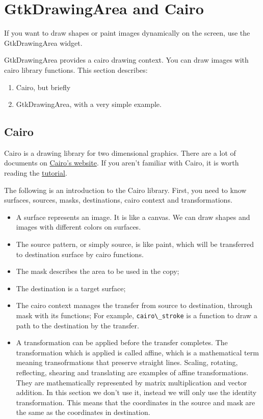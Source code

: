 \section{GtkDrawingArea and Cairo}\label{gtkdrawingarea-and-cairo}

If you want to draw shapes or paint images dynamically on the screen,
use the GtkDrawingArea widget.

GtkDrawingArea provides a cairo drawing context. You can draw images
with cairo library functions. This section describes:

\begin{enumerate}
\def\labelenumi{\arabic{enumi}.}
\tightlist
\item
  Cairo, but briefly
\item
  GtkDrawingArea, with a very simple example.
\end{enumerate}

\subsection{Cairo}\label{cairo}

Cairo is a drawing library for two dimensional graphics. There are a lot
of documents on \href{https://www.cairographics.org/}{Cairo's website}.
If you aren't familiar with Cairo, it is worth reading the
\href{https://www.cairographics.org/tutorial/}{tutorial}.

The following is an introduction to the Cairo library. First, you need
to know surfaces, sources, masks, destinations, cairo context and
transformations.

\begin{itemize}
\tightlist
\item
  A surface represents an image. It is like a canvas. We can draw shapes
  and images with different colors on surfaces.
\item
  The source pattern, or simply source, is like paint, which will be
  transferred to destination surface by cairo functions.
\item
  The mask describes the area to be used in the copy;
\item
  The destination is a target surface;
\item
  The cairo context manages the transfer from source to destination,
  through mask with its functions; For example,
  \passthrough{\lstinline!cairo\_stroke!} is a function to draw a path
  to the destination by the transfer.
\item
  A transformation can be applied before the transfer completes. The
  transformation which is applied is called affine, which is a
  mathematical term meaning transofrmations that preserve straight
  lines. Scaling, rotating, reflecting, shearing and translating are
  examples of affine transformations. They are mathematically
  represented by matrix multiplication and vector addition. In this
  section we don't use it, instead we will only use the identity
  transformation. This means that the coordinates in the source and mask
  are the same as the coordinates in destination.
\end{itemize}

